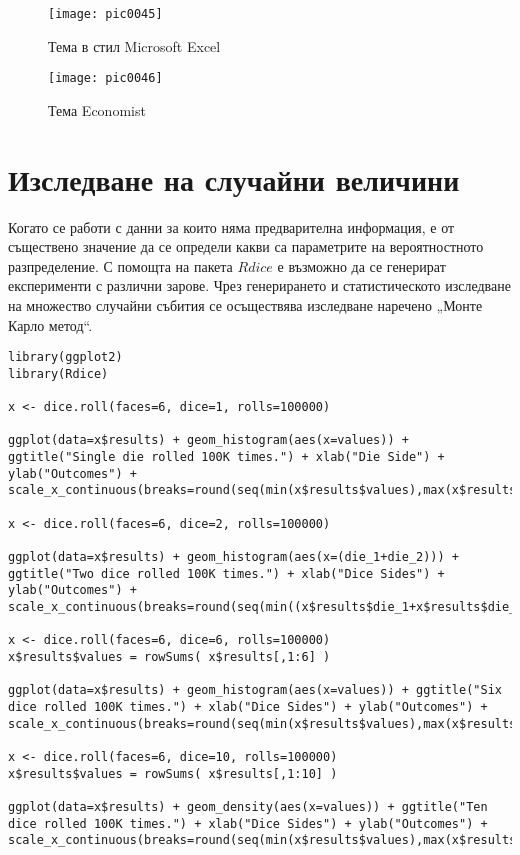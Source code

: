 \begin{figure}[h!]
  \centering
  \texttt{[image: pic0045]}
  \caption{Тема в стил Microsoft Excel}
\label{figure0045}
\end{figure}
\FloatBarrier

\begin{figure}[h!]
  \centering
  \texttt{[image: pic0046]}
  \caption{Тема Economist}
\label{figure0046}
\end{figure}
\FloatBarrier

\section{Изследване на случайни величини}

Когато се работи с данни за които няма предварителна информация, е от съществено значение да се определи какви са параметрите на вероятностното разпределение. С помощта на пакета $Rdice$ е възможно да се генерират експерименти с различни зарове. Чрез генерирането и статистическото изследване на множество случайни събития се осъществява изследване наречено „Монте Карло метод“.

\begin{lstlisting}[caption=Случайни величини със зарове, label=listing0156]
library(ggplot2)
library(Rdice)

x <- dice.roll(faces=6, dice=1, rolls=100000)

ggplot(data=x$results) + geom_histogram(aes(x=values)) + ggtitle("Single die rolled 100K times.") + xlab("Die Side") + ylab("Outcomes") + scale_x_continuous(breaks=round(seq(min(x$results$values),max(x$results$values),by=0.5)))

x <- dice.roll(faces=6, dice=2, rolls=100000)

ggplot(data=x$results) + geom_histogram(aes(x=(die_1+die_2))) + ggtitle("Two dice rolled 100K times.") + xlab("Dice Sides") + ylab("Outcomes") + scale_x_continuous(breaks=round(seq(min((x$results$die_1+x$results$die_2)),max((x$results$die_1+x$results$die_2)),by=0.5)))

x <- dice.roll(faces=6, dice=6, rolls=100000)
x$results$values = rowSums( x$results[,1:6] )

ggplot(data=x$results) + geom_histogram(aes(x=values)) + ggtitle("Six dice rolled 100K times.") + xlab("Dice Sides") + ylab("Outcomes") + scale_x_continuous(breaks=round(seq(min(x$results$values),max(x$results$values),by=0.5)))

x <- dice.roll(faces=6, dice=10, rolls=100000)
x$results$values = rowSums( x$results[,1:10] )

ggplot(data=x$results) + geom_density(aes(x=values)) + ggtitle("Ten dice rolled 100K times.") + xlab("Dice Sides") + ylab("Outcomes") + scale_x_continuous(breaks=round(seq(min(x$results$values),max(x$results$values),by=0.5)))
\end{lstlisting}

